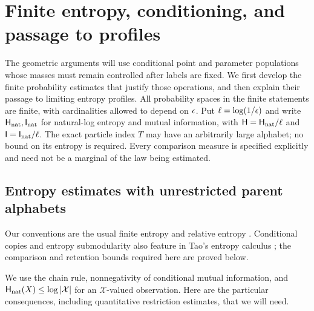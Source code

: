 \section{Finite entropy, conditioning, and passage to profiles}
\label{sec:entropy}

The geometric arguments will use conditional point and parameter
populations whose masses must remain controlled after labels are fixed.
We first develop the finite probability estimates that justify those
operations, and then explain their passage to limiting entropy profiles.
All probability spaces in the finite statements are finite, with
cardinalities allowed to depend on $\epsilon$. Put $\ell=\log(1/\epsilon)$ and
write $\mathsf H_{\mathrm{nat}},\mathsf I_{\mathrm{nat}}$ for natural-log entropy and mutual information,
with $\mathsf H=\mathsf H_{\mathrm{nat}}/\ell$ and $\mathsf I=\mathsf I_{\mathrm{nat}}/\ell$.
The exact particle index $T$ may have an arbitrarily large alphabet;
no bound on its entropy is required. Every comparison measure is
specified explicitly and need not be a marginal of the law being estimated.

\subsection{Entropy estimates with unrestricted parent alphabets}

Our conventions are the usual finite entropy and relative entropy
\citep{Shannon1948,KullbackLeibler1951}. Conditional copies and entropy
submodularity also feature in Tao's entropy calculus
\citep{Tao2010Entropy}; the comparison and
retention bounds required here are proved below.

We use the chain rule, nonnegativity of conditional mutual information,
and $\mathsf H_{\mathrm{nat}}(X)\le\log|\mathcal X|$ for an $\mathcal X$-valued observation.
Here are the particular consequences, including quantitative restriction
estimates, that we will need.

